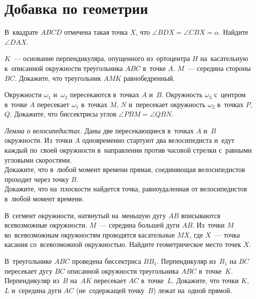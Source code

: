 

\section*{Добавка по геометрии}


\begin{problems}

\item
В~квадрате $ABCD$ отмечена такая точка $X$, что
$\angle BDX = \angle CBX  = \alpha$.
Найдите $\angle DAX$.

\item
$K$~--- основание перпендикуляра, опущенного из~ортоцентра $H$ на~касательную
к~описанной окружности треугольника $ABC$ в~точке $A$.
$M$~--- середина стороны $BC$.
Докажите, что треугольник $AMK$ равнобедренный.

\item
Окружности $\omega_1$ и~$\omega_2$ пересекаются в~точках $A$ и~$B$.
Окружность $\omega_3$ с~центром в~точке $A$ пересекает $\omega_1$ в~точках $M$,
$N$ и~пересекает окружность $\omega_2$ в~точках $P$, $Q$.
Докажите, что биссектрисы углов $\angle PBM = \angle QBN$.

\item\emph{Лемма о велосипедистах.}
Даны две пересекающиеся в~точках $A$ и~$B$ окружности.
Из~точки $A$ одновременно стартуют два велосипедиста и~едут каждый по~своей
окружности в~направлении против часовой стрелки с~равными угловыми скоростями.
\\
\sbp
Докажите, что в~любой момент времени прямая, соединяющая велосипедистов
проходит через точку $B$.
\\
\sbp
Докажите, что на~плоскости найдется точка, равноудаленная от велосипедистов
в~любой момент времени.

\item
В~сегмент окружности, натянутый на~меньшую дугу $AB$ вписываются всевозможные
окружности.
$M$~--- середина большей дуги $AB$.
Из~точки $M$ ко~всевозможным окружностям проводятся касательные $MX$,
где $X$~--- точка касания со~всевозможной окружностью.
Найдите геометрическое место точек $X$.

\item
В~треугольнике $ABC$ проведена биссектриса $B B_1$.
Перпендикуляр из~$B_1$ на $BC$ пересекает дугу $BC$ описанной окружности
треугольника $ABC$ в~точке~$K$.
Перпендикуляр из~$B$ на~$AK$ пересекает $AC$ в~точке~$L$.
Докажите, что точки $K$, $L$ и~середина дуги $AC$ (не~содержащей точку~$B$)
лежат на~одной прямой.

\end{problems}

